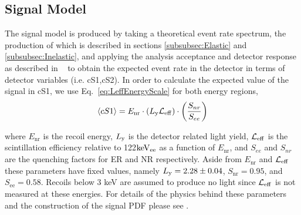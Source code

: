 \subsection{Signal Model}
\label{subsec:SignalModel}
The signal model is produced by taking a theoretical event rate spectrum, the production of which is described in sections \ref{subsubsec:Elastic} and \ref{subsubsec:Inelastic}, and applying the analysis acceptance and detector response as described in ~\cite{Aprile:2012vw}  to obtain the expected event rate in the detector in terms of detector variables (i.e. cS1,cS2). In order to calculate the expected value of the signal in cS1, we use Eq.~\ref{eq:LeffEnergyScale} for both energy regions, 
\begin{equation}
\label{eq:LeffEnergyScale}
	\langle cS1 \rangle = E_{\mathrm{nr}} \cdot (L_{\mathrm{y}} \mathcal{L}_{\mathrm{eff}}) \cdot   \left(\frac{S_{nr}}{S_{ee}}\right) 
\end{equation}

%
%
%

where $E_\mathrm{nr}$ is the recoil energy, $L_{\mathrm{y}}$ is the detector related light yield, $\mathcal{L}_{\mathrm{eff}}$ is the scintillation efficiency relative to 122$\mathrm{keV_{ee}}$ as a function of $E_\mathrm{nr}$, and $S_{ee}$ and $S_{nr}$ are the quenching factors for ER and NR respectively. Aside from $E_\mathrm{nr}$ and $\mathcal{L}_{\mathrm{eff}}$ these parameters have fixed values, namely $L_{\mathrm{y}} = 2.28 \pm 0.04$, $S_\mathrm{nr} = 0.95$, and $S_\mathrm{ee} = 0.58$. Recoils below 3 keV are assumed to produce no light since $\mathcal{L}_{\mathrm{eff}}$ is not measured at these energies. For details of the physics behind these parameters and the construction of the signal PDF please see \cite{Aprile:2012vw,xe100_run_combination}. 

